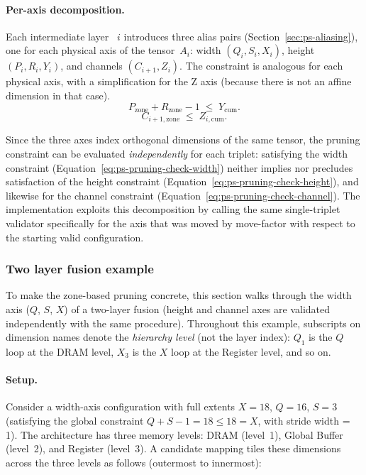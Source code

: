 \paragraph{Per-axis decomposition.}
Each intermediate layer ~$i$ introduces three alias pairs
(Section~\ref{sec:ps-aliasing}), one for each physical axis of the
tensor~$A_i$: width $(Q_i, S_i, X_i)$, height $(P_i, R_i, Y_i)$,
and channels $(C_{i+1}, Z_i)$.
The constraint is analogous for each physical axis, with a simplification for the Z axis (because there is not an affine dimension in that case).
\begin{equation}
\label{eq:ps-pruning-check-height}
  P_{\text{zone}} + R_{\text{zone}} - 1 \;\le\; Y_{\text{cum}}.
\end{equation}
\begin{equation}
\label{eq:ps-pruning-check-channel}
  C_{i+1, \text{zone}} \;\le\; Z_{i, \text{cum}}.
\end{equation}

Since the three axes index orthogonal dimensions of the same tensor, 
the pruning constraint can be evaluated \emph{independently} for each
triplet: satisfying the width constraint
(Equation~\ref{eq:ps-pruning-check-width}) neither implies nor precludes
satisfaction of the height constraint (Equation~\ref{eq:ps-pruning-check-height}), and likewise for the channel
constraint (Equation~\ref{eq:ps-pruning-check-channel}).
The implementation exploits this decomposition by calling the same
single-triplet validator specifically for the axis that was moved by move-factor with respect to the starting valid configuration.

\subsubsection{Two layer fusion example}
\label{sec:ps-pruning-example}

To make the zone-based pruning concrete, this section walks through
the width axis ($Q$, $S$, $X$) of a two-layer fusion (height and channel axes are
validated independently with the same procedure).
Throughout this example, subscripts on dimension names denote the
\emph{hierarchy level} (not the layer index): $Q_1$ is the $Q$ loop
at the DRAM level, $X_3$ is the $X$ loop at the Register level,
and so on.

\paragraph{Setup.}
Consider a width-axis configuration with full extents
$X = 18$, $Q = 16$, $S = 3$ (satisfying the global constraint
$Q + S - 1 = 18 \le 18 = X$, with stride width = 1).
The architecture has three memory levels: DRAM (level~1), Global
Buffer (level~2), and Register (level~3).
A candidate mapping tiles these dimensions across the three levels as
follows (outermost to innermost):

